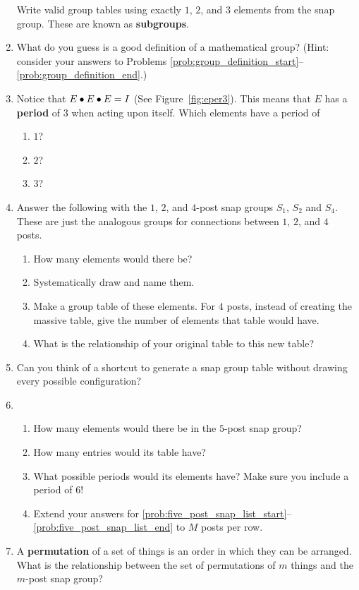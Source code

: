 \documentclass[../gatm.tex]{subfiles}
\begin{document}
\begin{enumerate}
	      Write valid group tables using exactly $1$, $2$, and $3$ elements from the snap group. These are known as \textbf{subgroups}.\label{prob:group_definition_end}
	\item What do you guess is a good definition of a mathematical group?
	      (Hint: consider your answers to Problems \ref{prob:group_definition_start}--\ref{prob:group_definition_end}.)
	\item Notice that $E\bullet E\bullet E=I$ (See Figure~\ref{fig:eper3}).
	      This means that $E$ has a \textbf{period} of $3$ when acting upon itself.
	      Which elements have a period of
	      \begin{multicols}{3}
		      \begin{enumerate}
			      \item $1$?
			      \item $2$?
			      \item $3$?
		      \end{enumerate}
	      \end{multicols}
	\item Answer the following with the $1$, $2$, and $4$-post snap groups $S_1$, $S_2$ and $S_4$. These are just the analogous groups for connections between $1$, $2$, and $4$ posts. \begin{enumerate}
		      \item How many elements would there be?
		      \item Systematically draw and name them.
		      \item Make a group table of these elements.
		            For $4$ posts, instead of creating the massive table, give the number of elements that table would have.
		      \item What is the relationship of your original table to this new table?
	      \end{enumerate}
	\item Can you think of a shortcut to generate a snap group table without drawing every possible configuration?
	\item \begin{enumerate}
		      \item How many elements would there be in the $5$-post snap group? \label{prob:five_post_snap_list_start}
		      \item How many entries would its table have?
		      \item What possible periods would its elements have? Make sure you include a period of $6$! \label{prob:five_post_snap_list_end}
		      \item Extend your answers for \ref{prob:five_post_snap_list_start}--\ref{prob:five_post_snap_list_end} to $M$ posts per row.
	      \end{enumerate}
	\item A \textbf{permutation} of a set of things is an order in which they can be arranged.
	      What is the relationship between the set of permutations of $m$ things and the $m$-post snap group?
\end{enumerate}
\end{document}
